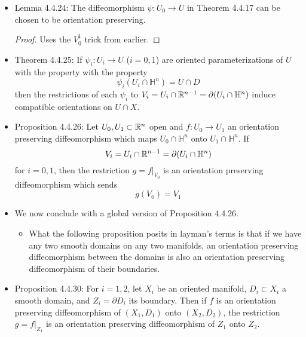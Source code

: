 \documentclass[../notes.tex]{subfiles}
\begin{document}
\begin{itemize}
\begin{itemize}
    \end{itemize}
    \item Lemma 4.4.24: The diffeomorphism $\psi:U_0\to U$ in Theorem 4.4.17 can be chosen to be orientation preserving.
    \begin{proof}
        Uses the $V_0^\sharp$ trick from earlier.
    \end{proof}
    \item Theorem 4.4.25: If $\psi_i:U_i\to U$ ($i=0,1$) are oriented parameterizations of $U$ with the property with the property
    \begin{equation*}
        \psi_i(U_i\cap\mathbb{H}^n) = U\cap D
    \end{equation*}
    then the restrictions of each $\psi_i$ to $V_i=U_i\cap\mathbb{R}^{n-1}=\partial(U_i\cap\mathbb{H}^n)$ induce compatible orientations on $U\cap X$.
    \item Proposition 4.4.26: Let $U_0,U_1\subset\mathbb{R}^n$ open and $f:U_0\to U_1$ an orientation preserving diffeomorphism which maps $U_0\cap\mathbb{H}^n$ onto $U_1\cap\mathbb{H}^n$. If
    \begin{equation*}
        V_i = U_i\cap\mathbb{R}^{n-1}
        = \partial(U_i\cap\mathbb{H}^n)
    \end{equation*}
    for $i=0,1$, then the restriction $g=f|_{V_0}$ is an orientation preserving diffeomorphism which sends
    \begin{equation*}
        g(V_0) = V_1
    \end{equation*}
    \item We now conclude with a global version of Proposition 4.4.26.
    \begin{itemize}
        \item What the following proposition posits in layman's terms is that if we have any two smooth domains on any two manifolds, an orientation preserving diffeomorphism between the domains is also an orientation preserving diffeomorphism of their boundaries.
    \end{itemize}
    \item Proposition 4.4.30: For $i=1,2$, let $X_i$ be an oriented manifold, $D_i\subset X_i$ a smooth domain, and $Z_i=\partial D_i$ its boundary. Then if $f$ is an orientation preserving diffeomorphism of $(X_1,D_1)$ onto $(X_2,D_2)$, the restriction $g=f|_{Z_1}$ is an orientation preserving diffeomorphism of $Z_1$ onto $Z_2$.
\end{itemize}
\end{document}

